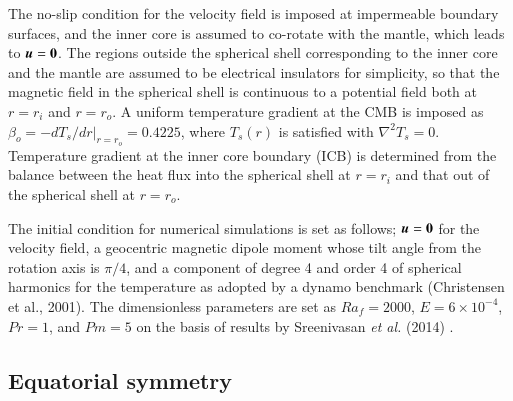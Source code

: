 The no-slip condition for the velocity field is imposed at impermeable boundary surfaces, and the inner core is assumed to co-rotate with the mantle, which leads to $\mbox{\boldmath$u$} = {\bf 0}$.
The regions outside the spherical shell corresponding to the inner core and the mantle are assumed to be electrical insulators for simplicity, so that the magnetic field in the spherical shell is continuous to a potential field both at $r = r_i$ and $r = r_o$.
A uniform temperature gradient at the CMB is imposed as $\beta_o = -d T_s / dr |_{r = r_o} = 0.4225$, where $T_s (r)$ is satisfied with $\nabla^2 T_s = 0$.
{\color{red}
Temperature gradient
}
at the inner core boundary (ICB) is determined from the balance between the heat flux into the spherical shell at $r = r_i$ and that out of the spherical shell at $r = r_o$.

The initial condition for numerical simulations is set as follows; $\mbox{\boldmath$u$} = {\bf 0}$ for the velocity field, a geocentric magnetic dipole moment whose tilt angle from the rotation axis is $\pi / 4$, and a component of degree 4 and order 4 of spherical harmonics for the temperature as adopted by a dynamo benchmark (Christensen et al., 2001).
The dimensionless parameters are set as $Ra_f = 2000$, $E = 6 \times 10^{-4}$, $Pr = 1$, and $Pm = 5$ on the basis of results by Sreenivasan {\it et al.} (2014) \cite{Sreenivasan:2014}.


\subsection{Equatorial symmetry}


